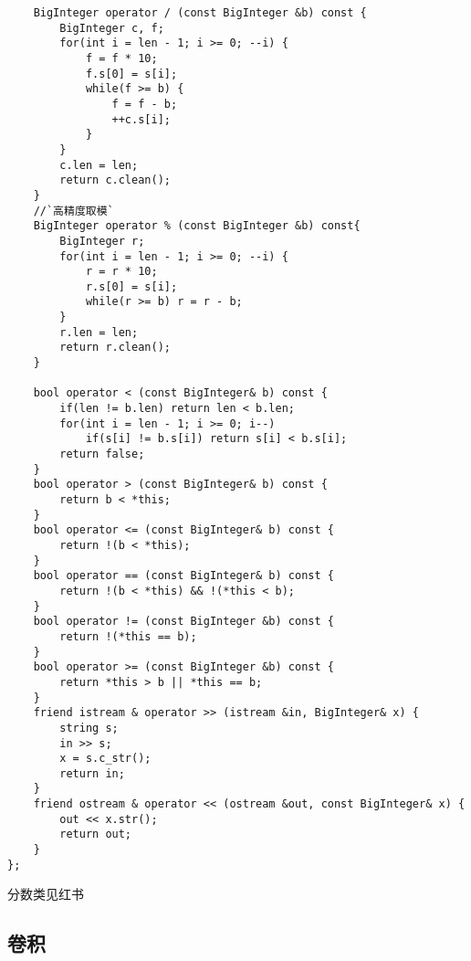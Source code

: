 \begin{lstlisting}
    BigInteger operator / (const BigInteger &b) const {
        BigInteger c, f;
        for(int i = len - 1; i >= 0; --i) {
            f = f * 10;
            f.s[0] = s[i];
            while(f >= b) {
                f = f - b;
                ++c.s[i];
            }
        }
        c.len = len;
        return c.clean();
    }
    //`高精度取模`
    BigInteger operator % (const BigInteger &b) const{
        BigInteger r;
        for(int i = len - 1; i >= 0; --i) {
            r = r * 10;
            r.s[0] = s[i];
            while(r >= b) r = r - b;
        }
        r.len = len;
        return r.clean();
    }

    bool operator < (const BigInteger& b) const {
        if(len != b.len) return len < b.len;
        for(int i = len - 1; i >= 0; i--)
            if(s[i] != b.s[i]) return s[i] < b.s[i];
        return false;
    }
    bool operator > (const BigInteger& b) const {
        return b < *this;
    }
    bool operator <= (const BigInteger& b) const {
        return !(b < *this);
    }
    bool operator == (const BigInteger& b) const {
        return !(b < *this) && !(*this < b);
    }
    bool operator != (const BigInteger &b) const {
        return !(*this == b);
    }
    bool operator >= (const BigInteger &b) const {
        return *this > b || *this == b;
    }
    friend istream & operator >> (istream &in, BigInteger& x) {
        string s;
        in >> s;
        x = s.c_str();
        return in;
    }
    friend ostream & operator << (ostream &out, const BigInteger& x) {
        out << x.str();
        return out;
    }
};
\end{lstlisting}

分数类见红书


\subsection{卷积}

